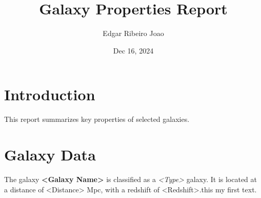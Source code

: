 \documentclass{article}
\title{Galaxy Properties Report}
\author{Edgar Ribeiro Joao}
\date{Dec 16, 2024}
\begin{document}
\maketitle

\section{Introduction}
This report summarizes key properties of selected galaxies.

\section{Galaxy Data}
The galaxy \textbf{<Galaxy Name>} is classified as a \textit{<Type>} galaxy. 
It is located at a distance of <Distance> Mpc, with a redshift of <Redshift>.this my first text.
\end{document}
